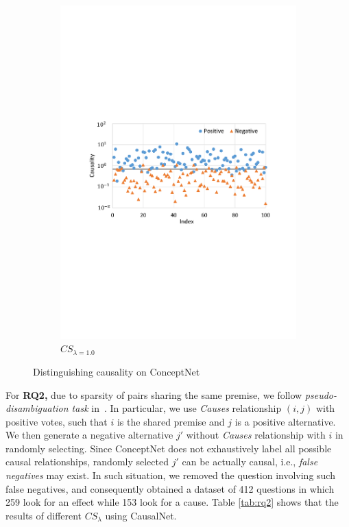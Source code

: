\documentclass[letterpaper]{article}
\newcommand{\tabref}[1]{Table \ref{#1}}
\begin{document}
\begin{figure}[ht!]
\begin{subfigure}[t]{0.9\columnwidth}
\centering
\includegraphics[width=0.9\columnwidth]{rq1-b}
\caption{$CS_{\lambda=1.0}$}
\end{subfigure}
\caption{Distinguishing causality on ConceptNet}
\label{fig:conceptApp1}
\end{figure}

For {\bf RQ2,}
due to sparsity of pairs sharing the same premise,
we follow \emph{pseudo-disambiguation task} in~\cite{Erk}.
In particular, we use \emph{Causes} relationship $(i,j)$ with
positive votes, such that $i$ is the shared premise and $j$ is a
positive alternative. We then generate a negative alternative 
$j'$ without \emph{Causes} relationship with $i$ in randomly selecting.
Since ConceptNet does not exhaustively
label all possible causal relationships, randomly selected $j'$ can
be actually causal, i.e., \emph{false negatives} may exist. In such
situation, we removed the question involving such false negatives,
and consequently obtained a dataset of 412 questions in which 259
look for an effect while 153 look for a cause. \tabref{tab:rq2}
shows that the results of different $CS_\lambda$
using CausalNet.
\end{document}
